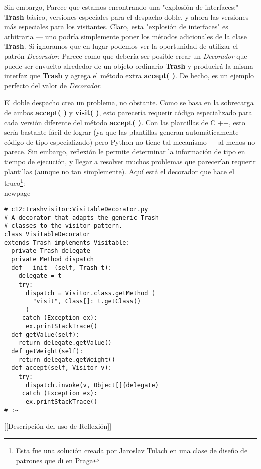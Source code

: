 Sin embargo, Parece que estamos encontrando una "explosión de interfaces:" \textbf{Trash} básico, versiones especiales para el despacho doble, y ahora las versiones más especiales para los visitantes. Claro, esta "explosión de interfaces" es arbitraria — uno podría simplemente poner los métodos adicionales de la clase \textbf{Trash}. Si ignoramos que en lugar podemos ver la oportunidad de utilizar el patrón \textit{Decorador}: Parece como que debería ser posible crear un \textit{Decorador} que puede ser envuelto alrededor de un objeto ordinario \textbf{Trash} y producirá la misma interfaz que \textbf{Trash} y agrega el método extra \textbf{accept( )}. De hecho, es un ejemplo perfecto del valor de \textit{Decorador}.         \newline

El doble despacho crea un problema, no obstante. Como se basa en la sobrecarga de ambos \textbf{accept( )} y \textbf{visit( )}, esto parecería requerir código especializado para cada versión diferente del método \textbf{accept( )}. Con las plantillas de C ++, esto sería bastante fácil de lograr (ya que las plantillas generan automáticamente código de tipo especializado) pero Python no tiene tal mecanismo — al menos no parece. Sin embargo, reflexión le permite determinar la información de tipo en tiempo de ejecución, y llegar a resolver muchos problemas que parecerían requerir plantillas (aunque no tan simplemente). Aquí está el decorador que hace el truco\footnote{Esta fue una solución creada por Jaroslav Tulach en una clase de diseño de patrones que di en Praga}:       \\newpage

\begin{lstlisting} 
# c12:trashvisitor:VisitableDecorator.py 
# A decorator that adapts the generic Trash 
# classes to the visitor pattern. 
class VisitableDecorator 
extends Trash implements Visitable: 
  private Trash delegate 
  private Method dispatch 
  def __init__(self, Trash t): 
    delegate = t 
    try: 
      dispatch = Visitor.class.getMethod ( 
        "visit", Class[]: t.getClass()  
      ) 
     catch (Exception ex): 
      ex.printStackTrace() 
  def getValue(self): 
    return delegate.getValue() 
  def getWeight(self): 
    return delegate.getWeight() 
  def accept(self, Visitor v): 
    try: 
      dispatch.invoke(v, Object[]{delegate) 
     catch (Exception ex): 
      ex.printStackTrace() 
# :~ 
\end{lstlisting}

[[Descripción del uso de Reflexión]]  \newline

